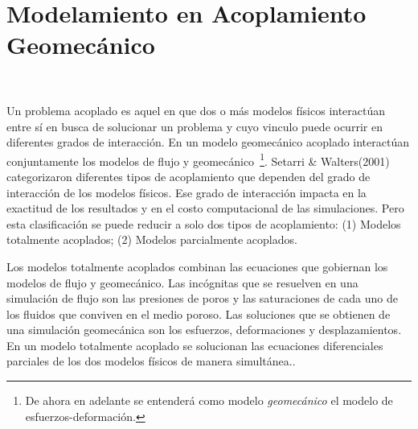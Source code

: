 %





\chapter{Modelamiento en Acoplamiento Geomecánico}~\hypertarget{chapter_03}{}
\label{ch:chapter_03}

Un problema acoplado es aquel en que dos o más modelos físicos interactúan entre sí en busca de solucionar un problema y cuyo vinculo puede ocurrir en diferentes grados de interacción\cite{Tran2005}. En un modelo geomecánico acoplado interactúan conjuntamente los modelos de flujo y geomecánico~\footnote{De ahora en adelante se entenderá como modelo \textit{geomecánico} el modelo de esfuerzos-deformación.}. Setarri \& Walters(2001) \cite{Settari2001} categorizaron diferentes tipos de acoplamiento que dependen del grado de interacción de los modelos físicos. Ese grado de interacción impacta en la exactitud de los resultados y en el costo computacional de las simulaciones. Pero esta clasificación se puede reducir a solo dos tipos de acoplamiento: (1) Modelos totalmente acoplados; (2) Modelos parcialmente acoplados.\bigskip

Los modelos totalmente acoplados combinan las ecuaciones que gobiernan los modelos de flujo y geomecánico. Las incógnitas que se resuelven en una simulación de flujo son las presiones de poros y las saturaciones de cada uno de los fluidos que conviven en el medio poroso. Las soluciones que se obtienen de una simulación geomecánica son los esfuerzos, deformaciones y desplazamientos. En un modelo totalmente acoplado se solucionan las ecuaciones diferenciales parciales de los dos modelos físicos de manera simultánea.\bigskip.

